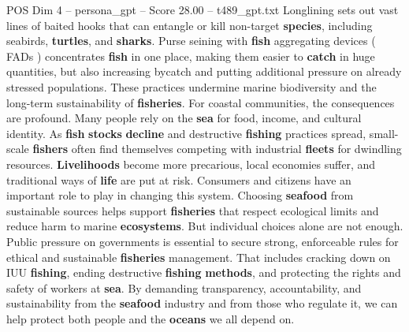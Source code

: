 \begin{textsample}{POS Dim 4 – persona\_gpt – Score 28.00 – t489\_gpt.txt}
Longlining sets out vast lines of baited hooks that can entangle or kill non-target \textbf{species}, including seabirds, \textbf{turtles}, and \textbf{sharks}.
Purse seining with \textbf{fish} aggregating devices ( FADs ) concentrates \textbf{fish} in one place, making them easier to \textbf{catch} in huge quantities, but also increasing bycatch and putting additional pressure on already stressed populations.
These practices undermine marine biodiversity and the long-term sustainability of \textbf{fisheries}.
For coastal communities, the consequences are profound.
Many people rely on the \textbf{sea} for food, income, and cultural identity.
As \textbf{fish} \textbf{stocks} \textbf{decline} and destructive \textbf{fishing} practices spread, small-scale \textbf{fishers} often find themselves competing with industrial \textbf{fleets} for dwindling resources. \textbf{Livelihoods} become more precarious, local economies suffer, and traditional ways of \textbf{life} are put at risk.
Consumers and citizens have an important role to play in changing this system.
Choosing \textbf{seafood} from sustainable sources helps support \textbf{fisheries} that respect ecological limits and reduce harm to marine \textbf{ecosystems}.
But individual choices alone are not enough.
Public pressure on governments is essential to secure strong, enforceable rules for ethical and sustainable \textbf{fisheries} management.
That includes cracking down on IUU \textbf{fishing}, ending destructive \textbf{fishing} \textbf{methods}, and protecting the rights and safety of workers at \textbf{sea}.
By demanding transparency, accountability, and sustainability from the \textbf{seafood} industry and from those who regulate it, we can help protect both people and the \textbf{oceans} we all depend on.

\end{textsample}
